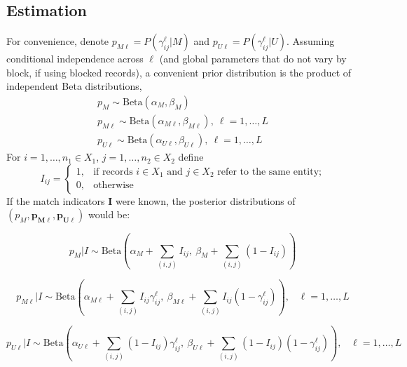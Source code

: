 \documentclass[11pt,reqno]{amsart}
\newcommand\gamij{\mathbf{\gamma_{ij}}}
\begin{document}
\subsection{Estimation} For convenience, denote $p_{M\ell} = P(\gamma_{ij}^{\ell} | M)$ and $ p_{U\ell} = P(\gamma_{ij}^{\ell} | U)$.  Assuming conditional independence across $\ell$ (and global parameters that do not vary by block, if using blocked records), a convenient prior distribution is the product of independent Beta distributions,
 \begin{gather*}
 p_M \sim \text{Beta}(\alpha_M, \beta_M) \\
 p_{M\ell} \sim \text{Beta}(\alpha_{M\ell}, \beta_{M\ell}), \ \ell = 1,\dots, L \\
  p_{U\ell} \sim \text{Beta}(\alpha_{U\ell}, \beta_{U\ell}), \ \ell = 1,\dots, L 
 \end{gather*}
 For $i=1,\dots,n_1 \in X_1$, $j = 1, \dots, n_2 \in X_2$ define
$$I_{ij} = \begin{cases} 1, & \text{if records $i\in X_1$ and $j\in X_2$ refer to the same entity;} \\ 0, & \text{otherwise} \end{cases} $$  
If the match indicators $\mathbf{I}$ were known, the posterior distributions of $\left(p_M, \mathbf{p_{M\ell}, p_{U\ell}}\right)$ would be:

\begin{equation}
p_M | I \sim \text{Beta}\left(\alpha_M + \sum_{(i,j)} I_{ij},\ \beta_M + \sum_{(i,j)} (1- I_{ij})\right) 
\label{eq:pM}
\end{equation}

\begin{equation}
p_{M\ell} | I \sim \text{Beta}\left(\alpha_{M\ell} + \sum_{(i,j)} I_{ij}\gamma_{ij}^{\ell},\ \beta_{M\ell} + \sum_{(i,j)} I_{ij} (1-\gamma_{ij}^{\ell})\right), \hspace{10pt} \ell = 1,\dots, L
\label{eq:pML}
\end{equation}

\begin{equation}
p_{U\ell} | I \sim \text{Beta}\left(\alpha_{U\ell} + \sum_{(i,j)}(1-I_{ij})\gamma_{ij}^{\ell},\ \beta_{U\ell} + \sum_{(i,j)}(1-I_{ij})(1-\gamma_{ij}^{\ell})\right), \hspace{10pt} \ell = 1,\dots, L
\label{eq:pUL}
\end{equation}

\end{document}
